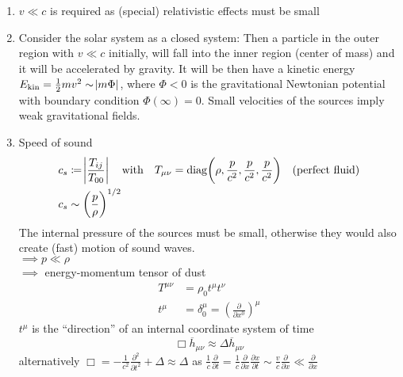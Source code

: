 \begin{enumerate}[{ad} 1.]
    \item $v\ll c$ is required as (special) relativistic effects must be small
    \item Consider the solar system as a closed system: Then a particle in the outer region with $v\ll c$ initially,
    will fall into the inner region (center of mass) and it will be accelerated by gravity. It will be then have a kinetic energy
    $E_\text{kin} = \frac{1}{2} m v^2 \sim \abs{m \Phi}$, where $\Phi < 0$ is the gravitational Newtonian potential with boundary condition
    $\Phi(\infty) = 0$. Small velocities of the sources imply weak gravitational fields.
    \item Speed of sound
    \begin{align}
        & c_s \coloneqq \abs{\frac{T_{ij}}{T_{00}}} \quad \text{with} \quad T_{\mu\nu} = \diag \left( \rho, \frac{p}{c^2}, \frac{p}{c^2}, \frac{p}{c^2} \right) \quad \text{(perfect fluid)} \\
        & c_s \sim \left( \frac{p}{\rho} \right)^{1/2}
    \end{align}
    The internal pressure of the sources must be small, otherwise they would also create (fast) motion of sound waves. \\
    $\implies p \ll \rho$ \\
    $\implies$ energy-momentum tensor of dust
    \begin{align}
        T^{\mu\nu} &= \rho_0 t^\mu t^\nu \\
        t^\mu &= \delta^\mu_0 = \left( \frac{\partial}{\partial x^0} \right)^\mu
    \end{align}
    $t^\mu$ is the ``direction'' of an internal coordinate system of time
    \begin{equation}
        \Box \overline{h}_{\mu\nu} \approx \Delta \overline{h}_{\mu\nu}
    \end{equation}
    alternatively $\Box = - \frac{1}{c^2} \frac{\partial^2}{\partial t^2} + \Delta \approx \Delta$ as 
    $\frac{1}{c} \frac{\partial}{\partial t} = \frac{1}{c} \frac{\partial}{\partial x} \frac{\partial x}{\partial t} 
    \sim \frac{v}{c} \frac{\partial}{\partial x} \ll \frac{\partial}{\partial x}$
\end{enumerate}

